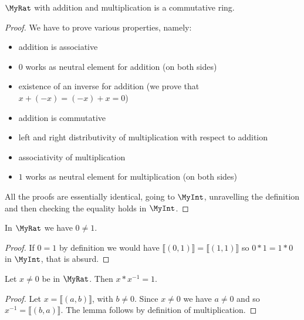 \begin{proposition}
    \label{MyRat.commRing}
    \leanok
    $\MyRat$ with addition and multiplication is a commutative ring.
\end{proposition}
\begin{proof}
    \leanok
    We have to prove various properties, namely:
    \begin{itemize}
        \item addition is associative
        \item $0$ works as neutral element for addition (on both sides)
        \item existence of an inverse for addition (we prove that $x + (-x) = (-x) + x = 0$)
        \item addition is commutative
        \item left and right distributivity of multiplication with respect to addition
        \item associativity of multiplication
        \item $1$ works as neutral element for multiplication (on both sides)
    \end{itemize}
    All the proofs are essentially identical, going to $\MyInt$, unravelling the definition and then
    checking the equality holds in $\MyInt$.
\end{proof}

\begin{lemma}
    \label{MyRat.zero_ne_one}
    \leanok
In $\MyRat$ we have $0 \neq 1$.
\end{lemma}
\begin{proof}
    \leanok
    If $0 = 1$ by definition we would have $⟦ (0,1) ⟧ = ⟦ (1,1) ⟧$
    so $0*1=1*0$ in $\MyInt$, that is absurd.
\end{proof}

\begin{lemma}
    \label{MyRat.mul_inv_cancel}
    \leanok
Let $x \neq 0$ be in $\MyRat$. Then $x * x^{-1} = 1$.
\end{lemma}
\begin{proof}
    \leanok
    Let $x = ⟦ (a,b) ⟧$, with $b \neq 0$. Since $x \neq 0$ we have $a \neq 0$ and so
    $x^{-1} = ⟦ (b,a) ⟧$. The lemma follows by definition of multiplication.
\end{proof}

